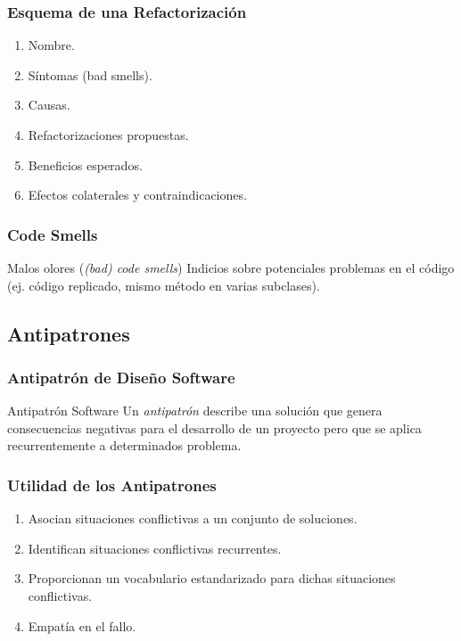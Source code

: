 ﻿\documentclass[animated,a4paper,slidestop,xcolor=pst,blue]{beamer}
\begin{document}
\begin{frame}[c]
	\frametitle{Esquema de una Refactorización}
	\begin{enumerate}
		\item<1-> Nombre.
		\item<2-> Síntomas (bad smells).
		\item<3-> Causas.
		\item<4-> Refactorizaciones propuestas.
		\item<5-> Beneficios esperados.
		\item<6-> Efectos colaterales y contraindicaciones.
	\end{enumerate}
\end{frame}

\begin{frame}[c]
	\frametitle{Code Smells}
    \begin{block}{Malos olores (\emph{(bad) code smells})}
		Indicios sobre potenciales problemas en el código (ej. código replicado, mismo método en varias subclases).
	  \end{block}
\end{frame}

\subsection{Antipatrones}

\begin{frame}[c]
	\frametitle{Antipatrón de Diseño Software}
	\begin{block}{Antipatrón Software}
        Un \emph{antipatrón} describe una solución que genera consecuencias negativas para el desarrollo de un proyecto pero que se aplica recurrentemente a determinados problema.
	\end{block}
\end{frame}

\begin{frame}[c]
	\frametitle{Utilidad de los Antipatrones}
	\begin{enumerate}[<+->]
        \item Asocian situaciones conflictivas a un \alert{conjunto de soluciones}.
        \item Identifican situaciones conflictivas recurrentes.
        \item Proporcionan un vocabulario estandarizado para dichas situaciones conflictivas.
        \item Empatía en el fallo.
	\end{enumerate}
\end{frame}
\end{document}
